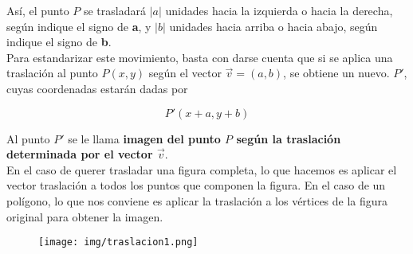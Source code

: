 Así, el punto $P$ se trasladará $|a|$ unidades hacia la izquierda o hacia la derecha, según indique el signo de \textbf{a}, y $|b|$ unidades hacia arriba o hacia abajo, según indique el signo de \textbf{b}.\\

Para estandarizar este movimiento, basta con darse cuenta que si se aplica una traslación al punto $P(x,y)$ según el vector $\vec{v} = (a,b)$, se obtiene un nuevo. $P'$, cuyas coordenadas estarán dadas por 

\[P' (x+a, y+b)\]

Al punto $P'$ se le llama \textbf{imagen del punto $P$ según la traslación determinada por el vector $\vec{v}$}.\\


En el caso de querer trasladar una figura completa, lo que hacemos es aplicar el vector traslación a todos los puntos que componen la figura. En el caso de un polígono, lo que nos conviene es aplicar la traslación a los vértices de la figura original para obtener la imagen.

\begin{figure}[hbt!]
	\centering
	\texttt{[image: img/traslacion1.png]}
\end{figure}




